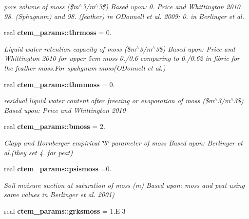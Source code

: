 \begin{DoxyCompactItemize}
\begin{DoxyCompactList}\small\item\em pore volume of moss (\$m$^\wedge$3/m$^\wedge$3\$) Based upon\+: 0. Price and Whittington 2010 98. (Sphagnum) and 98. (feather) in O\textquotesingle{}Donnell et al. 2009; 0. in Berlinger et al. \end{DoxyCompactList}\item 
\hypertarget{namespacectem__params_aecb4d53264357fb5440a4bb71e5e1c2f}{}real {\bfseries ctem\+\_\+params\+::thrmoss} = 0.\label{namespacectem__params_aecb4d53264357fb5440a4bb71e5e1c2f}

\begin{DoxyCompactList}\small\item\em Liquid water retention capacity of moss (\$m$^\wedge$3/m$^\wedge$3\$) Based upon\+: Price and Whittington 2010 for upper 5cm moss 0./0.6 comparing to 0./0.62 in fibric for the feather moss.\+For spahgnum moss(O\textquotesingle{}Donnell et al.) \end{DoxyCompactList}\item 
\hypertarget{namespacectem__params_a1ec880bc9f809448914c2f7cf94d4493}{}real {\bfseries ctem\+\_\+params\+::thmmoss} = 0.\label{namespacectem__params_a1ec880bc9f809448914c2f7cf94d4493}

\begin{DoxyCompactList}\small\item\em residual liquid water content after freezing or evaporation of moss (\$m$^\wedge$3/m$^\wedge$3\$) Based upon\+: Price and Whittington 2010 \end{DoxyCompactList}\item 
\hypertarget{namespacectem__params_a23ae1a2b2657682100b05a0a5554f36f}{}real {\bfseries ctem\+\_\+params\+::bmoss} = 2.\label{namespacectem__params_a23ae1a2b2657682100b05a0a5554f36f}

\begin{DoxyCompactList}\small\item\em Clapp and Hornberger empirical \char`\"{}b\char`\"{} parameter of moss Based upon\+: Berlinger et al.(they set 4. for peat) \end{DoxyCompactList}\item 
\hypertarget{namespacectem__params_a01402bac0f2145c50c4b89642cb58a80}{}real {\bfseries ctem\+\_\+params\+::psismoss} =0.\label{namespacectem__params_a01402bac0f2145c50c4b89642cb58a80}

\begin{DoxyCompactList}\small\item\em Soil moisure suction at saturation of moss (m) Based upon\+: moss and peat using same values in Berlinger et al. 2001) \end{DoxyCompactList}\item 
\hypertarget{namespacectem__params_ac6a30c2dccbba72bd498bed33c71aef4}{}real {\bfseries ctem\+\_\+params\+::grksmoss} = 1.\+E-\/3\label{namespacectem__params_ac6a30c2dccbba72bd498bed33c71aef4}


\end{DoxyCompactItemize}
